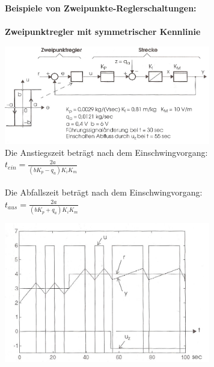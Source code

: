 		\newpage
		\textbf{Beispiele von Zweipunkte-Reglerschaltungen:}\\ \\
		\textbf{Zweipunktregler mit symmetrischer Kennlinie } \\
		\begin{minipage}{9cm}
			\vspace{.5cm}        
	 		\includegraphics[width=9cm]{./bilder/Zweipunktregler-b+b2.jpg}\\
			Die Anstiegszeit beträgt nach dem Einschwingvorgang:\\
			$t_{ein}=\frac{2a}{(b K_p - q_a)K_i K_m}$ \\ \\
			Die Abfallszeit beträgt nach dem Einschwingvorgang:\\
			$t_{aus}=\frac{2a}{(b K_p + q_a)K_i K_m}$
        \end{minipage}
		\begin{minipage}{9cm}
			\vspace{.5cm}        
			\includegraphics[width=9cm]{./bilder/Zweipunktregler-b+b_dia.jpg}
        \end{minipage}\\

